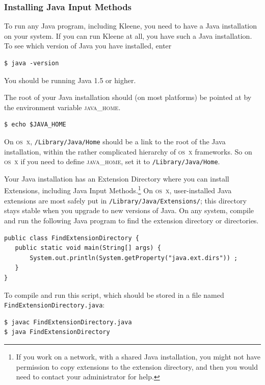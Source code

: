 \documentclass[letterpaper,12pt]{article}
\newcommand{\acro}{\textsc}
\begin{document}
\subsubsection{Installing Java Input Methods}

To run any Java program, including Kleene, you need to have a Java
installation on your system.  If you can run Kleene at all, you have such
a Java installation.  To see which version of Java you have installed,
enter

\begin{Verbatim}[fontsize=\small]
$ java -version
\end{Verbatim}

\noindent
You should be running Java 1.5 or higher.

The root of your Java installation should (on most platforms) be pointed
at by the environment variable \acro{java\_home}.  

\begin{Verbatim}[fontsize=\small]
$ echo $JAVA_HOME
\end{Verbatim}

\noindent
On \acro{os~x}, \texttt{/Library/Java/Home} should be a link to the root
of the Java installation, within the rather complicated hierarchy of
\acro{os~x} frameworks.  So on \acro{os~x} if you need to define
\acro{java\_home}, set it to \texttt{/Library/Java/Home}.

Your Java installation has an Extension Directory where you can install
Extensions, including Java Input Methods.\footnote{If you work on a
network, with a shared Java installation, you might not have permission
to copy extensions to the extension directory, and then you would need to
contact your administrator for help.}  On \acro{os~x}, user-installed
Java extensions are most safely put in
\texttt{/Library/Java/Extensions/}; this directory stays stable when you
upgrade to new versions of Java.  On any system, compile and run the
following Java program to find the extension directory or
directories.

\begin{Verbatim}[fontsize=\small]
public class FindExtensionDirectory {
   public static void main(String[] args) {
       System.out.println(System.getProperty("java.ext.dirs")) ;
   }
}
\end{Verbatim}
 
\noindent
To compile and run this script, which should be stored in a file
named \texttt{FindExtensionDirectory.java}:

\begin{Verbatim}[fontsize=\small]
$ javac FindExtensionDirectory.java
$ java FindExtensionDirectory
\end{Verbatim}
\end{document}
